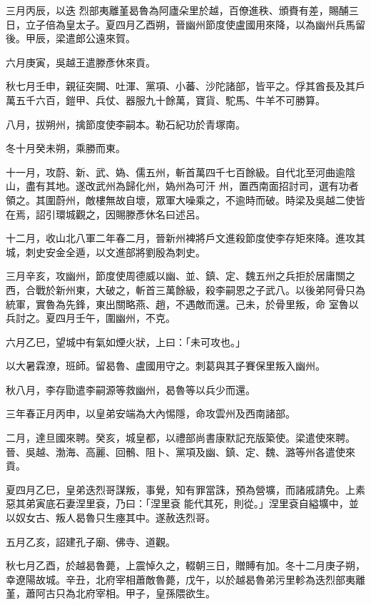 \begin{pinyinscope}
 三月丙辰，以迭
 烈部夷離堇曷魯為阿廬朵里於越，百僚進秩、頒賚有差，賜酺三日，立子倍為皇太子。夏四月乙酉朔，晉幽州節度使盧國用來降，以為幽州兵馬留後。甲辰，梁遣郎公遠來賀。



 六月庚寅，吳越王遣滕彥休來貢。



 秋七月壬申，親征突闕、吐渾、黨項、小蕃、沙陀諸部，皆平之。俘其酋長及其戶萬五千六百，鎧甲、兵仗、器服九十餘萬，寶貨、駝馬、牛羊不可勝算。



 八月，拔朔州，擒節度使李嗣本。勒石紀功於青塚南。



 冬十月癸未朔，乘勝而東。



 十一月，攻蔚、新、武、媯、儒五州，斬首萬四千七百餘級。自代北至河曲逾陰山，盡有其地。遂改武州為歸化州，媯州為可汗
 州，置西南面招討司，選有功者領之。其圍蔚州，敵樓無故自壞，眾軍大噪乘之，不逾時而破。時梁及吳越二使皆在焉，詔引環城觀之，因賜滕彥休名曰述呂。



 十二月，收山北八軍二年春二月，晉新州裨將戶文進殺節度使李存矩來降。進攻其城，刺史安金全遁，以文進部將劉殷為刺史。



 三月辛亥，攻幽州，節度使周德威以幽、並、鎮、定、魏五州之兵拒於居庸關之西，合戰於新州東，大破之，斬首三萬餘級，殺李嗣恩之子武八。以後弟阿骨只為統軍，實魯為先鋒，東出關略燕、趙，不遇敵而還。己未，於骨里叛，命
 室魯以兵討之。夏四月壬午，圍幽州，不克。



 六月乙巳，望城中有氣如煙火狀，上曰：「未可攻也。」



 以大暑霖潦，班師。留曷魯、盧國用守之。刺葛與其子賽保里叛入幽州。



 秋八月，李存勖遣李嗣源等救幽州，曷魯等以兵少而還。



 三年春正月丙申，以皇弟安端為大內惕隱，命攻雲州及西南諸部。



 二月，達旦國來聘。癸亥，城皇都，以禮部尚書康默記充版築使。梁遣使來聘。晉、吳越、渤海、高麗、回鶻、阻卜、黨項及幽、鎮、定、魏、潞等州各遣使來貢。



 夏四月乙巳，皇弟迭烈哥謀叛，事覺，知有罪當誅，預為營壙，而諸戚請免。上素惡其弟寅底石妻涅里袞，乃曰：「涅里袞
 能代其死，則從。」涅里袞自縊壙中，並以奴女古、叛人曷魯只生瘞其中。遂赦迭烈哥。



 五月乙亥，詔建孔子廟、佛寺、道觀。



 秋七月乙酉，於越曷魯薨，上震悼久之，輟朝三日，贈賻有加。冬十二月庚子朔，幸遼陽故城。辛丑，北府宰相蕭敵魯薨，戊午，以於越曷魯弟污里軫為迭烈部夷離堇，蕭阿古只為北府宰相。甲子，皇孫隈欲生。



\end{pinyinscope}
